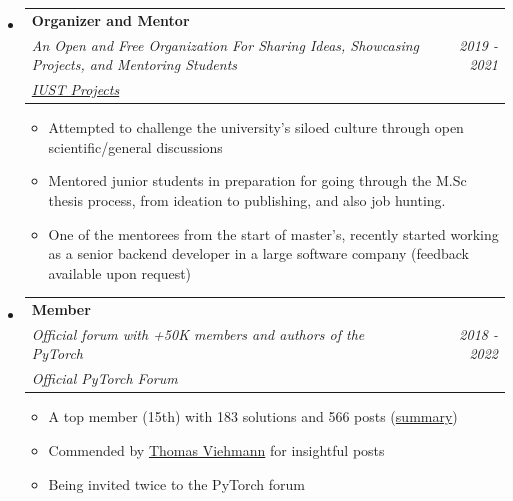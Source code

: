 \documentclass[letterpaper,11pt]{article}
\makeatletter
\newcommand{\resumeItem}[1]{
  \item\small{
    {#1 \vspace{0pt}}
  }
}
\newcommand{\resumeSubheading}[5]{
  \item
    \begin{tabular*}{0.97\textwidth}{l@{\extracolsep{\fill}}r}
      \textbf{#1} & #2 \\ 
      \textit{\small#3} & \textit{\small #4} \\
      \textit{#5} & 
    \end{tabular*}\vspace{-5pt}
}
\newcommand{\resumeSubheadingF}[4]{
  \item
    \begin{tabular*}{0.97\textwidth}{l@{\extracolsep{\fill}}r}
      \textbf{#1} & #2 \\ 
      \textit{\small#3} & \textit{\small #4} \\
    \end{tabular*}\vspace{-5pt}
}
\newcommand{\resumeSubHeadingListStart}{\begin{itemize}[leftmargin=*]}
\newcommand{\resumeSubHeadingListEnd}{\end{itemize}}
\newcommand{\resumeItemListStart}{\begin{itemize}}
\newcommand{\resumeItemListEnd}{\end{itemize}\vspace{-5pt}}
\makeatother
\begin{document}
  \resumeSubHeadingListStart
    \resumeSubheading
      {Organizer and Mentor}{}
      {An Open and Free Organization For Sharing Ideas, Showcasing Projects, and Mentoring Students} 
      {2019 - 2021}{\href{http://iust-projects.ir/}{IUST Projects}}
      \resumeItemListStart
        \resumeItem{Attempted to challenge the university's siloed culture through open scientific/general discussions}
        \resumeItem{Mentored junior students in preparation for going through the M.Sc thesis process, from ideation to publishing, and also job hunting.}
        \resumeItem{One of the mentorees from the start of master's, recently started working as a senior backend developer in a large software company (feedback available upon request)}
      \resumeItemListEnd
  \resumeSubHeadingListEnd

  \resumeSubHeadingListStart
    \resumeSubheading
      {Member}{}
      {Official forum with +50K members and authors of the PyTorch} 
      {2018 - 2022}{{Official PyTorch Forum}}
      \resumeItemListStart
        \resumeItem{A top member (15th) with 183 solutions and 566 posts (\href{https://discuss.pytorch.org/u/Nikronic/}{summary})}
        \resumeItem{Commended by \href{https://twitter.com/ThomasViehmann/status/1309794697049714689}{Thomas Viehmann} for insightful posts}
        \resumeItem{Being invited twice to the PyTorch forum}
      \resumeItemListEnd
  \resumeSubHeadingListEnd

\end{document}
